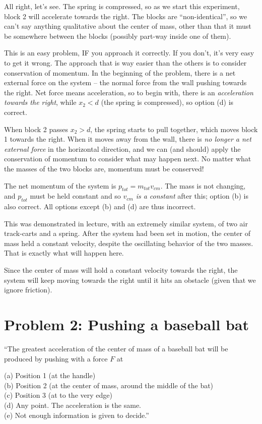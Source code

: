 \documentclass[12pt,a4paper]{report}
\begin{document}
All right, let's see. The spring is compressed, so as we start this experiment, block 2 will accelerate towards the right. The blocks are ``non-identical'', so we can't say anything qualitative about the center of mass, other than that it must be somewhere between the blocks (possibly part-way inside one of them).

This is an easy problem, IF you approach it correctly. If you don't, it's very easy to get it wrong. The approach that is way easier than the others is to consider conservation of momentum. In the beginning of the problem, there is a net external force on the system -- the normal force from the wall pushing towards the right. Net force means acceleration, so to begin with, there is an \emph{acceleration towards the right}, while $x_2 < d$ (the spring is compressed), so option (d) is correct.

When block 2 passes $x_2 > d$, the spring starts to pull together, which moves block 1 towards the right. When it moves away from the wall, there is \emph{no longer a net external force} in the horizontal direction, and we can (and should) apply the conservation of momentum to consider what may happen next. No matter what the masses of the two blocks are, momentum must be conserved!

The net momentum of the system is $p_{tot} = m_{tot} v_{cm}$. The mass is not changing, and $p_{tot}$ must be held constant and so $v_{cm}$ \emph{is a constant} after this; option (b) is also correct. All options except (b) and (d) are thus incorrect.

This was demonstrated in lecture, with an extremely similar system, of two air track-carts and a spring. After the system had been set in motion, the center of mass held a constant velocity, despite the oscillating behavior of the two masses. That is exactly what will happen here.

Since the center of mass will hold a constant velocity towards the right, the system will keep moving towards the right until it hits an obstacle (given that we ignore friction).

\section{Problem 2: Pushing a baseball bat}

``The greatest acceleration of the center of mass of a baseball bat will be produced by pushing with a force $F$ at

(a) Position 1 (at the handle)\\
(b) Position 2 (at the center of mass, around the middle of the bat)\\
(c) Position 3 (at to the very edge)\\
(d) Any point. The acceleration is the same.\\
(e) Not enough information is given to decide.''
\end{document}
